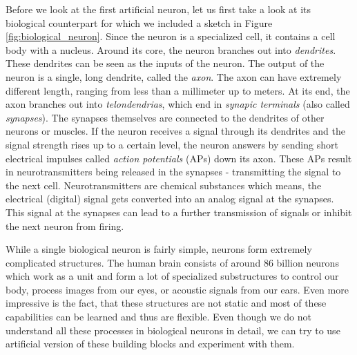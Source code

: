 
Before we look at the first artificial neuron, let us first take a look at its biological counterpart for which we included a sketch in Figure \ref{fig:biological_neuron}. Since the neuron is a specialized cell, it contains a cell body with a nucleus. Around its core, the neuron branches out into \textit{dendrites}. These dendrites can be seen as the inputs of the neuron. The output of the neuron is a single, long dendrite, called the \textit{axon}. The axon can have extremely different length, ranging from less than a millimeter up to meters. At its end, the axon branches out into \textit{telondendrias}, which end in \textit{synapic terminals} (also called \textit{synapses}). The synapses themselves are connected to the dendrites of other neurons or muscles. If the neuron receives a signal through its dendrites and the signal strength rises up to a certain level, the neuron answers by sending short electrical impulses called \textit{action potentials} (APs) down its axon. These APs result in neurotransmitters being released in the synapses - transmitting the signal to the next cell. Neurotransmitters are chemical substances which means, the electrical (digital) signal gets converted into an analog signal at the synapses. This signal at the synapses can lead to a further transmission of signals or inhibit the next neuron from firing. 

While a single biological neuron is fairly simple, neurons form extremely complicated structures. The human brain consists of around 86 billion neurons which work as a unit and form a lot of specialized substructures to control our body, process images from our eyes, or acoustic signals from our ears. Even more impressive is the fact, that these structures are not static and most of these capabilities can be learned and thus are flexible. Even though we do not understand all these processes in biological neurons in detail, we can try to use artificial version of these building blocks and experiment with them.

